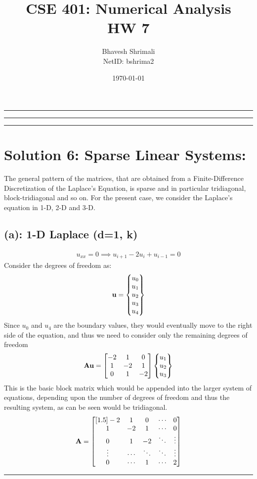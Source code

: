 
\title{\bf CSE 401: Numerical Analysis \\ HW 7}
\author{Bhavesh Shrimali \\ NetID: bshrima2}
\date{\today}
\titlespacing*{\title}{-2ex}{*-2ex}{-2ex}

\maketitle\hrule\hrule\hrule
\section*{Solution 6: Sparse Linear Systems:}
The general pattern of the matrices, that are obtained from a Finite-Difference Discretization of the Laplace's Equation, is sparse and in particular tridiagonal, block-tridiagonal and so on. For the present case, we consider the Laplace's equation in 1-D, 2-D and 3-D.
\subsection*{(a): 1-D Laplace (d=1, k)}
\begin{align*}
u_{xx} = 0 \implies u_{i+1} - 2u_i + u_{i-1} = 0
\end{align*}
Consider the degrees of freedom as:
\begin{align*}
{\bf u}
=
\begin{Bmatrix}
u_0\\u_1\\u_2\\u_3\\u_4
\end{Bmatrix}
\end{align*}
Since $u_0$ and $u_4$ are the boundary values, they would eventually move to the right side of the equation, and thus we need to consider only the remaining degrees of freedom
\begin{align*}
{\bf A}{\bf u} = \begin{bmatrix}
-2 & 1 & 0 \\
1 & -2 & 1\\
0 & 1 & -2
\end{bmatrix}
\begin{Bmatrix}
u_1\\u_2\\u_3
\end{Bmatrix}
\end{align*}
This is the basic block matrix which would be appended into the larger system of equations, depending upon the number of degrees of freedom and thus the resulting system, as can be seen would be tridiagonal.
\begin{align*}
{\bf A} = 
\begin{bmatrix}[1.5]
-2 & 1 & 0 & \cdots & 0\\
1 & -2 & 1 & \cdots & 0 \\
0 & 1 & -2 & \ddots & \vdots\\
\vdots & \cdots & \ddots & \ddots & \vdots \\
0 & \cdots & 1 & \cdots & 2 
\end{bmatrix}
\end{align*}\hrule
